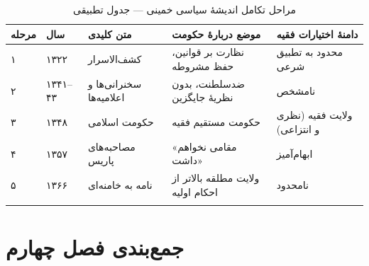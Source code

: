 \documentclass[12pt,a4paper]{book}
\begin{document}
\begin{longtable}{%
    >{\centering\arraybackslash}p{}
    >{\raggedleft\arraybackslash}p{}
    >{\raggedleft\arraybackslash}p{}
    >{\raggedleft\arraybackslash}p{}
    >{\raggedleft\arraybackslash}p{}}
\toprule
\rowcolor{cGold!15}
\textbf{مرحله} & \textbf{سال} & \textbf{متن کلیدی} & \textbf{موضع دربارهٔ حکومت} & \textbf{دامنهٔ اختیارات فقیه} \\
\midrule
\endhead

\cellcolor{cGreen!8} ۱ & \cellcolor{cGreen!8} ۱۳۲۲ & \cellcolor{cGreen!8} کشف‌الاسرار & \cellcolor{cGreen!8} نظارت بر قوانین، حفظ مشروطه & \cellcolor{cGreen!8} محدود به تطبیق شرعی \\
\midrule

\cellcolor{cGold!8} ۲ & \cellcolor{cGold!8} ۱۳۴۱–۴۳ & \cellcolor{cGold!8} سخنرانی‌ها و اعلامیه‌ها & \cellcolor{cGold!8} ضدسلطنت، بدون نظریهٔ جایگزین & \cellcolor{cGold!8} نامشخص \\
\midrule

\cellcolor{cWarn!8} ۳ & \cellcolor{cWarn!8} ۱۳۴۸ & \cellcolor{cWarn!8} حکومت اسلامی & \cellcolor{cWarn!8} حکومت مستقیم فقیه & \cellcolor{cWarn!8} ولایت فقیه (نظری و انتزاعی) \\
\midrule

\cellcolor{cPrimary!8} ۴ & \cellcolor{cPrimary!8} ۱۳۵۷ & \cellcolor{cPrimary!8} مصاحبه‌های پاریس & \cellcolor{cPrimary!8} «مقامی نخواهم داشت» & \cellcolor{cPrimary!8} ابهام‌آمیز \\
\midrule

\cellcolor{cAccent!8} ۵ & \cellcolor{cAccent!8} ۱۳۶۶ & \cellcolor{cAccent!8} نامه به خامنه‌ای & \cellcolor{cAccent!8} ولایت مطلقه بالاتر از احکام اولیه & \cellcolor{cAccent!8} نامحدود \\

\bottomrule
\caption{مراحل تکامل اندیشهٔ سیاسی خمینی — جدول تطبیقی}
\label{tab:evolution-stages}
\end{longtable}

\section{جمع‌بندی فصل چهارم}
\end{document}
